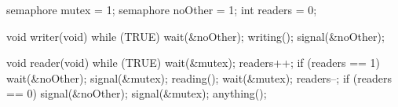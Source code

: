 \documentclass[varwidth=29em,crop]{standalone}
\begin{document}
\begin{minipage}{.42\linewidth}
\vspace{1em}
\begin{ccode}
semaphore mutex = 1;
semaphore noOther = 1;
int readers = 0;

void writer(void)
{
  while (TRUE) {
    wait(&noOther);
      writing();
    signal(&noOther);
  }
}        
\end{ccode}
\end{minipage}\qquad
\begin{minipage}{.48\linewidth}
\vspace{1em}
\begin{ccode}
void reader(void)
{
  while (TRUE) {
    wait(&mutex);
      readers++;
      if (readers == 1)
         wait(&noOther);
    signal(&mutex);
    reading();
    wait(&mutex);
      readers--;
      if (readers == 0)
        signal(&noOther);
    signal(&mutex);
    anything();
  }
}      
\end{ccode}  
\end{minipage}
\end{document}
